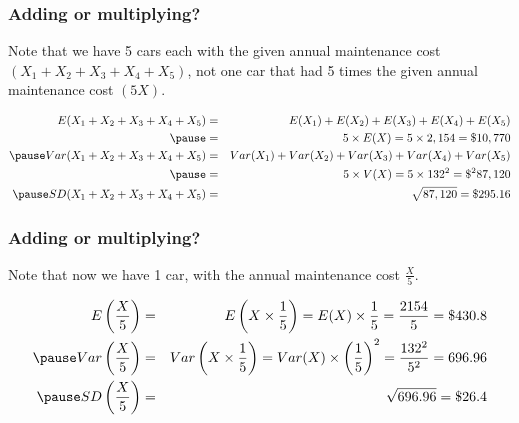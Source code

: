 \documentclass[slidestop,compress,mathserif]{beamer}
\begin{document}
\begin{frame}
\frametitle{Adding or multiplying?}


\pause

Note that we have 5 cars each with the given annual maintenance cost $(X_1 + X_2 + X_3 + X_4 + X_5)$, not one car that had 5 times the given annual maintenance cost $(5X)$.

\pause

{\small
\begin{eqnarray*} 
E(X_1 + X_2 + X_3 + X_4 + X_5) &=& E(X_1) + E(X_2) + E(X_3) + E(X_4) + E(X_5) \\
\pause
&=& 5 \times E(X) = 5 \times 2,154 = \$ 10,770 \\
\pause
Var(X_1 + X_2 + X_3 + X_4 + X_5) &=& Var(X_1) + Var(X_2) + Var(X_3) + Var(X_4) + Var(X_5) \\
\pause
&=& 5 \times V(X) = 5 \times 132^2 = \$^2 87,120 \\
\pause
SD(X_1 + X_2 + X_3 + X_4 + X_5) &=& \sqrt{87,120} =  \$ 295.16
\end{eqnarray*}
}

\end{frame}


\begin{frame}
\frametitle{Adding or multiplying?}


\pause

Note that now we have 1 car, with the annual maintenance cost $\frac{X}{5}$.

\pause 

{\small
\begin{eqnarray*} 
E\left(\frac{X}{5}\right) &=& E\left(X\times \frac{1}{5}\right) = E(X) \times \frac{1}{5} = \frac{2154}{5}  = \$ 430.8 \\
\pause
Var\left(\frac{X}{5}\right) &=& Var\left(X\times \frac{1}{5}\right) = Var(X) \times \left(\frac{1}{5}\right)^2 = \frac{132^2}{5^2} =  696.96 \\
\pause
SD\left(\frac{X}{5}\right) &=& \sqrt{696.96} =  \$ 26.4
\end{eqnarray*}
}

\end{frame}
\end{document}
